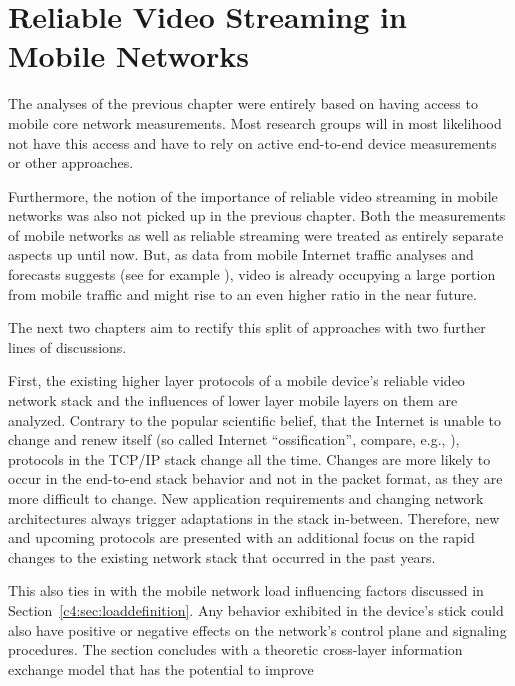 \chapter{Reliable Video Streaming in Mobile Networks}
\label{chap:mobilestreaming}

The analyses of the previous chapter were entirely based on having access to mobile core network measurements. Most research groups will in most likelihood not have this access and have to rely on active end-to-end device measurements or other approaches.

Furthermore, the notion of the importance of reliable video streaming in mobile networks was also not picked up in the previous chapter. Both the measurements of mobile networks as well as reliable streaming were treated as entirely separate aspects up until now. But, as data from mobile Internet traffic analyses and forecasts suggests (see for example \cite{cisco2014VNI}), video is already occupying a large portion from mobile traffic and might rise to an even higher ratio in the near future.

The next two chapters aim to rectify this split of approaches with two further lines of discussions. 

First, the existing higher layer protocols of a mobile device's reliable video network stack and the influences of lower layer mobile layers on them are analyzed. Contrary to the popular scientific belief, that the Internet is unable to change and renew itself (so called Internet ``ossification'', compare, e.g., \cite{feldmann2010ossification}), protocols in the \gls{TCP}/\gls{IP} stack change all the time. Changes are more likely to occur in the end-to-end stack behavior and not in the packet format, as they are more difficult to change. New application requirements and changing network architectures always trigger adaptations in the stack in-between. Therefore, new and upcoming protocols are presented with an additional focus on the rapid changes to the existing network stack that occurred in the past years.

This also ties in with the mobile network load influencing factors discussed in Section~\ref{c4:sec:loaddefinition}. Any behavior exhibited in the device's stick could also have positive or negative effects on the network's control plane and signaling procedures. The section concludes with a theoretic cross-layer information exchange model that has the potential to improve 

